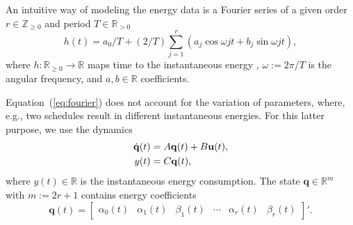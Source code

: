 \documentclass[letterpaper,10pt,conference,twoside]{IEEEtran}
\theoremstyle{definition}
\begin{document}


An intuitive way of modeling the energy data is a Fourier series of a given order $r\in\mathbb{Z}_{\geq 0}$ and period $T\in\mathbb{R}_{>0}$
\begin{equation}\label{eq:fourier}
  h(t)=a_0/T+(2/T)\sum_{j=1}^{r}{\left(a_j\cos{\omega jt}+b_j\sin{\omega jt}\right)},
\end{equation}
where $h:\mathbb{R}_{\geq 0}\rightarrow\mathbb{R}$ maps time to the instantaneous energy%
, $\omega:=2\pi/T$ is the angular frequency, and $a,b\in\mathbb{R}$ %
coefficients.

Equation~(\ref{eq:fourier}) does not account for the variation of parameters, where, e.g., two schedules result in different instantaneous energies.
For this latter purpose, we use the dynamics %
\begin{subequations}\label{eq:state-perf}\vspace*{-3ex}
  \begin{align}
  \dot{\mathbf{q}}(t)&=A\mathbf{q}(t)+B\mathbf{u}(t),\label{eq:state-perf-q}\\
  y(t)&=C\mathbf{q}(t),\label{eq:state-perf-y}
\end{align}
\end{subequations}
where $y(t)\in\mathbb{R}$ is the instantaneous energy consumption. The state $\mathbf{q}\in\mathbb{R}^m$ with $m:=2r+1$ contains energy coefficients
\begin{equation}
  \mathbf{q}(t)=\begin{bmatrix}
    \alpha_0(t) & \alpha_1(t) & \beta_1(t) & \cdots & \alpha_r(t) & \beta_r(t)
  \end{bmatrix}'.
\end{equation}
\end{document}
